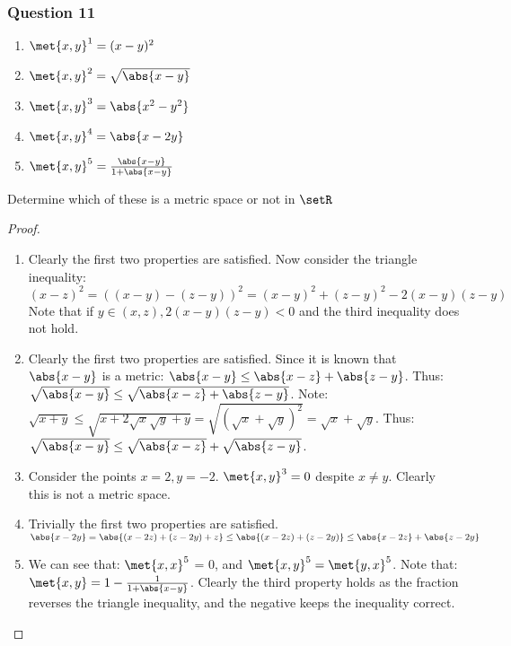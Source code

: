 \documentclass[12pt, letterpaper]{paper}
\begin{document}
\subsubsection{Question 11}
\label{sec:org67749a4}
\begin{question}
  \begin{enumerate}
  \item $\met{x,y}^1 = (x-y)^2$
  \item $\met{x,y}^2 = \sqrt{ \abs{ x - y }}$
  \item $\met{x,y}^3 = \abs{ x^2 - y^2}$
  \item $\met{x,y}^4 = \abs{ x - 2y}$
  \item $\met{x,y}^5 = \frac{\abs{x-y}}{1 + \abs{x-y}}$
  \end{enumerate}
  Determine which of these is a metric space or not in $\setR$
\end{question}
\begin{proof}
  \begin{enumerate}
  \item Clearly the first two properties are satisfied. Now consider
    the triangle inequality:
    $(x-z)^2 = ( (x-y) - (z-y) )^2 = (x-y)^2 + (z-y)^2 - 2(x-y)(z-y)$
    Note that if $y \in (x,z), 2(x-y)(z-y) < 0$ and the third
    inequality does not hold.

  \item Clearly the first two properties are satisfied. Since it is
    known that $\abs{x-y}$ is a metric:
    $\abs{x-y} \leq \abs{x-z} + \abs{z-y}$. Thus:
    $\sqrt{\abs{x-y}} \leq \sqrt{\abs{x-z} + \abs{z-y}}$. Note:
    $\sqrt{x+y} \leq \sqrt{ x + 2\sqrt{x}\sqrt{y} + y} = \sqrt{
      (\sqrt{x} + \sqrt{y})^2} = \sqrt{x} + \sqrt{y}$. Thus:
    $\sqrt{\abs{x-y}} \leq \sqrt{\abs{x-z}} + \sqrt{\abs{z-y}}$.
    
  \item Consider the points $x=2,y=-2$. $\met{x,y}^3 = 0$ despite
    $x\neq y$. Clearly this is not a metric space.
      
  \item Trivially the first two properties are satisfied.
    $\abs{x-2y} = \abs{(x-2z) + (z - 2y) + z} \leq \abs{ (x-2z) + (z -
      2y) } \leq \abs{ x - 2z} + \abs{z-2y}$

  \item We can see that: $\met{x,x}^{5}$ = 0, and
    $\met{x,y}^5 = \met{y,x}^5$. Note that:
    $\met{x,y} = 1 - \frac{1}{1+\abs{x-y}}$. Clearly the third
    property holds as the fraction reverses the triangle inequality,
    and the negative keeps the inequality correct.
  \end{enumerate}
\end{proof}
\end{document}
